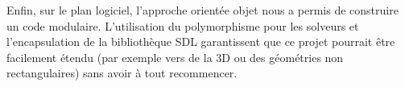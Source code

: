 \documentclass[a4paper,12pt]{article}
\begin{document}
Enfin, sur le plan logiciel, l'approche orientée objet nous a permis de construire un code modulaire. L'utilisation du polymorphisme pour les solveurs et l'encapsulation de la bibliothèque SDL garantissent que ce projet pourrait être facilement étendu (par exemple vers de la 3D ou des géométries non rectangulaires) sans avoir à tout recommencer.
\end{document}

